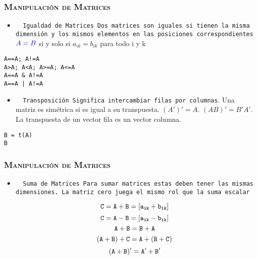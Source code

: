 \documentclass[16.5pt]{beamer}
\begin{document}
{
\begin{frame}
\frametitle{\textsc{\textbf{Manipulación de Matrices}}}
\hspace*{-5mm}
\vspace*{-5mm} 
\vspace{0.3cm}

\begin{itemize}
\item \texttt{ {\color{blue} Igualdad de Matrices} Dos matrices son iguales si tienen la misma dimensión y los mismos elementos en las posiciones correspondientes  }
$\color{blue} A= B$ si y solo si $a_{ik}= b_{ik}$ para todo i y k

\end{itemize}

\begin{lstlisting}
A==A; A!=A
A>A; A<A; A>=A; A<=A
A==A & A!=A
A==A | A!=A
\end{lstlisting}
\begin{itemize}
\item \texttt{ {\color{blue} Transposición} Significa intercambiar filas por columnas}. Una matriz es simétrica si es igual a su transpuesta. $(A')'=A$. $(AB)' = B'A'$. La transpuesta de un vector fila es un vector columna.
\end{itemize}
\begin{lstlisting}
B = t(A)
B
\end{lstlisting}

\end{frame}
}

{
\begin{frame}
\frametitle{\textsc{\textbf{Manipulación de Matrices}}}
\hspace*{-5mm}
\vspace*{-5mm} 
\vspace{0.3cm}

\begin{itemize}
\item \texttt{ {\color{blue} Suma de Matrices} Para sumar matrices estas deben tener las mismas dimensiones. La matriz cero juega el mismo rol que la suma escalar}

$$\color{black} \mathtt{C = A + B=[a_{ik} + b_{ik}]}$$
$$\color{black} \mathtt{C = A - B =[a_{ik} - b_{ik}]}$$
$$\color{black} \mathtt{A + B= B + A}$$
$$\color{black} \mathtt{(A + B) + C= A +(B + C)}$$
$$\color{black} \mathtt{(A + B)'= A' +B'}$$


\end{itemize}
\end{frame}
}
\end{document}
